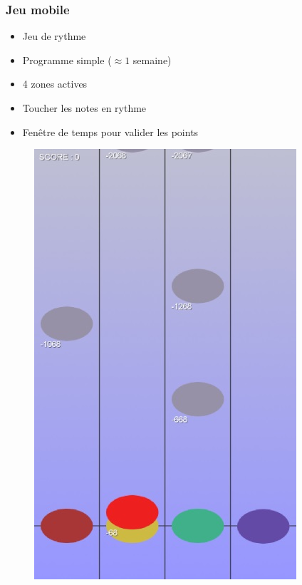 \begin{frame}
\frametitle{Jeu mobile}
\begin{multicols}{2} 
\begin{itemize}
\item Jeu de rythme
\item Programme simple ($\approx 1$ semaine)
\item 4 zones actives
\item Toucher les notes en rythme
\item Fenêtre de temps pour valider les points
\end{itemize} 
\columnbreak 
\begin{figure}
\includegraphics[scale=0.4]{images/jeu3.jpg}
\end{figure}
\end{multicols}
\end{frame}

